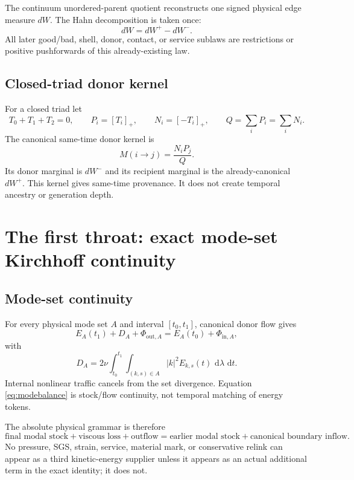 \documentclass[11pt]{article}
\newcommand{\dd}{\,\mathrm d}
\begin{document}
The continuum unordered-parent quotient reconstructs one signed physical edge measure $dW$.  The Hahn decomposition is taken once:
\begin{equation}\label{eq:oneHahn}
\boxed{dW=dW^+-dW^-.}
\end{equation}
All later good/bad, shell, donor, contact, or service sublaws are restrictions or positive pushforwards of this already-existing law.

\subsection{Closed-triad donor kernel}

For a closed triad let
\[
T_0+T_1+T_2=0,
\qquad
P_i=[T_i]_+,
\qquad
N_i=[-T_i]_+,
\qquad
Q=\sum_iP_i=\sum_iN_i.
\]
The canonical same-time donor kernel is
\begin{equation}\label{eq:donorkernel}
\boxed{
M(i\to j)=\frac{N_iP_j}{Q}.
}
\end{equation}
Its donor marginal is $dW^-$ and its recipient marginal is the already-canonical $dW^+$.  This kernel gives same-time provenance.  It does not create temporal ancestry or generation depth.

\section{The first throat: exact mode-set Kirchhoff continuity}

\subsection{Mode-set continuity}

For every physical mode set $A$ and interval $[t_0,t_1]$, canonical donor flow gives
\begin{equation}\label{eq:modebalance}
\boxed{
E_A(t_1)+D_A+\Phi_{\mathrm{out},A}
=E_A(t_0)+\Phi_{\mathrm{in},A},
}
\end{equation}
with
\begin{equation}\label{eq:DA}
D_A
=2\nu\int_{t_0}^{t_1}
\int_{(k,s)\in A}|k|^2E_{k,s}(t)\,\dd\lambda\,\dd t.
\end{equation}
Internal nonlinear traffic cancels from the set divergence.  Equation \eqref{eq:modebalance} is stock/flow continuity, not temporal matching of energy tokens.

The absolute physical grammar is therefore
\begin{equation}\label{eq:absolutegrammar}
\boxed{
\text{final modal stock}
+\text{viscous loss}
+\text{outflow}
=
\text{earlier modal stock}
+\text{canonical boundary inflow}.
}
\end{equation}
No pressure, SGS, strain, service, material mark, or conservative relink can appear as a third kinetic-energy supplier unless it appears as an actual additional term in the exact identity; it does not.
\end{document}
